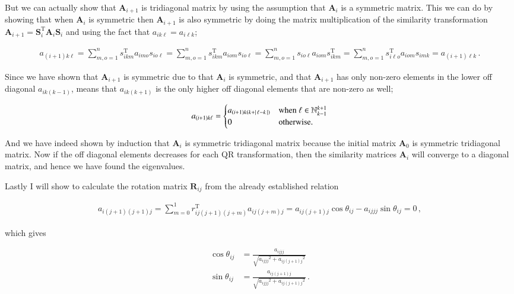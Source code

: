 \documentclass[11pt,english,a4paper]{article}
\begin{document}
\begin{flushleft}
But we can actually show that $\textbf{A}_{i+1}$ is tridiagonal matrix by using the assumption that $\textbf{A}_i$ is a symmetric matrix. This we can do by showing that when $\textbf{A}_i$ is symmetric then $\textbf{A}_{i+1}$ is also symmetric by doing the matrix multiplication of the similarity transformation $\textbf{A}_{i+1} = \textbf{S}_i^{\text{T}}\textbf{A}_i \textbf{S}_i$ and using the fact that $a_{ik\ell} =a_{i\ell k}$;

\begin{align*}
a_{(i+1)k\ell} = \sum_{m,o=1}^n s_{ikm}^{\text{T}}a_{imo} s_{io\ell} 
= \sum_{m,o=1}^n s_{ikm}^{\text{T}}a_{iom} s_{io\ell} 
= \sum_{m,o=1}^n s_{io\ell}a_{iom}s_{ikm}^{\text{T}} 
= \sum_{m,o=1}^n s_{i\ell o}^{\text{T}}a_{iom}s_{imk}
= a_{(i+1)\ell k} \,.
\end{align*}

Since we have shown that $\textbf{A}_{i+1}$ is symmetric due to that $\textbf{A}_i$ is symmetric, and that $\textbf{A}_{i+1}$ has only non-zero elements in the lower off diagonal $a_{ik(k-1)}$, means that $a_{ik(k+1)}$ is the only higher off diagonal elements that are non-zero as well;

\begin{align}
a_{(i+1)k\ell} = \begin{cases} a_{(i+1)k(k+\left\vert{\,\ell-k\,}\right\vert)} & \text{when } \ell \in \mathbb{N}_{k-1}^{k+1} \\ 0 & \text{otherwise.}\end{cases}
\label{eq_27}
\end{align}

And we have indeed shown by induction that $\textbf{A}_i$ is symmetric tridiagonal matrix because the initial matrix $\textbf{A}_0$ is symmetric tridiagonal matrix. Now if the off diagonal elements decreases for each QR transformation, then the similarity matrices $\textbf{A}_i$ will converge to a diagonal matrix, and hence we have found the eigenvalues. \linebreak

Lastly I will show to calculate the rotation matrix $\textbf{R}_{ij}$ from the already established relation

\begin{align*}
a_{i(j+1)(j+1)j} = \sum_{m=0}^1 r_{ij(j+1)(j+m)}^{\text{T}} a_{ij(j+m)j} = a_{ij(j+1)j}\cos\theta_{ij}-a_{ijjj}\sin\theta_{ij} = 0 \,,
\end{align*}

which gives

\begin{align}
\cos\theta_{ij} &= \frac{a_{ijjj}}{\sqrt{{a_{ijjj}}^2+{a_{ij(j+1)j}}^2}}
\label{eq_28}
\\
\sin\theta_{ij} &= \frac{a_{ij(j+1)j}}{\sqrt{{a_{ijjj}}^2+{a_{ij(j+1)j}}^2}} \,.
\label{eq_29}
\end{align}


\end{flushleft}
\end{document}
